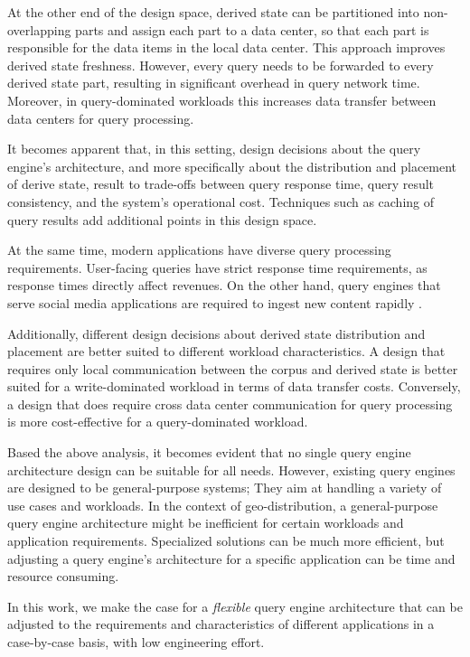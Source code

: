 At the other end of the design space,
derived state can be partitioned into non-overlapping parts and assign each part to a data center,
so that each part is responsible for the data items in the local data center.
This approach improves derived state freshness.
However, every query needs to be forwarded to every derived state part, resulting in significant overhead in query network time.
Moreover, in query-dominated workloads this increases data transfer between data centers for query processing.

\bigskip
\noindent
It becomes apparent that, in this setting, design decisions about the query engine's architecture,
and more specifically about the distribution and placement of derive state,
result to trade-offs between query response time, query result consistency, and the system's operational cost.
Techniques such as caching of query results add additional points in this design space.

At the same time,
modern applications have diverse query processing requirements.
User-facing queries have strict response time requirements, as response times directly affect revenues.
On the other hand, query engines that serve social media applications are required to ingest new content rapidly \cite{busch:earlybird}.

Additionally, different design decisions about derived state distribution and placement are better suited to different workload characteristics.
A design that requires only local communication between the corpus and derived state is better suited for a
write-dominated workload in terms of data transfer costs.
Conversely, a design that does require cross data center communication for query processing is more cost-effective
for a query-dominated workload.

\bigskip
\noindent
Based the above analysis, it becomes evident that no single query engine architecture design can be suitable for all
needs.
However, existing query engines are designed to be general-purpose systems;
They aim at handling a variety of use cases and workloads.
In the context of geo-distribution, a general-purpose query engine architecture might be inefficient for certain workloads
and application requirements.
Specialized solutions can be much more efficient, but adjusting a query engine's architecture for a specific application
can be time and resource consuming.

In this work, we make the case for a \textit{flexible} query engine architecture that can be adjusted to the requirements
and characteristics of different applications in a case-by-case basis, with low engineering effort.

